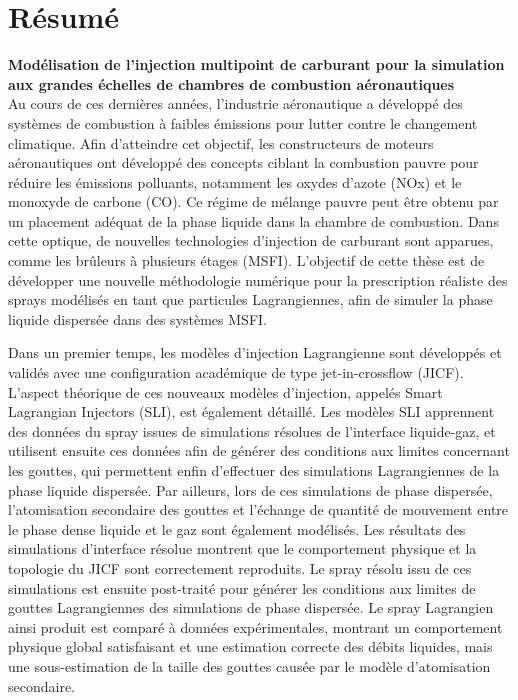     
\newpage
\shipout\null 
{}
\newpage
    
\chapter*{Résumé}

{\large \textbf{Modélisation de l'injection multipoint de carburant pour la simulation aux grandes échelles de chambres de combustion aéronautiques }} \\

Au cours de ces dernières années, l’industrie aéronautique a développé des systèmes de combustion à faibles émissions pour lutter contre le changement climatique. Afin d'atteindre cet objectif, les constructeurs de moteurs aéronautiques ont développé des concepts ciblant la combustion pauvre pour réduire les émissions polluants, notamment les oxydes d’azote (NOx) et le monoxyde de carbone (CO). Ce régime de mélange pauvre peut être obtenu par un placement adéquat de la phase liquide dans la chambre de combustion. Dans cette optique, de nouvelles technologies d’injection de carburant sont apparues, comme les brûleurs à plusieurs étages (MSFI). L’objectif de cette thèse est de développer une nouvelle méthodologie numérique pour la prescription réaliste des sprays modélisés en tant que particules Lagrangiennes, afin de simuler la phase liquide dispersée dans des systèmes MSFI.

Dans un premier temps, les modèles d’injection Lagrangienne sont développés et validés avec une configuration académique de type jet-in-crossflow (JICF). L’aspect théorique de ces nouveaux modèles d’injection, appelés Smart Lagrangian Injectors (SLI), est également détaillé. Les modèles SLI apprennent des données du spray issues de simulations résolues de l’interface liquide-gaz, et utilisent ensuite ces données afin de générer des conditions aux limites concernant les gouttes, qui permettent enfin d’effectuer des simulations Lagrangiennes de la phase liquide dispersée. Par ailleurs, lors de ces simulations de phase dispersée, l’atomisation secondaire des gouttes et l’échange de quantité de mouvement entre le phase dense liquide et le gaz sont également modélisés. Les résultats des simulations d’interface résolue montrent que le comportement physique et la topologie du JICF sont correctement reproduits. Le spray résolu issu de ces simulations est ensuite post-traité pour générer les conditions aux limites de gouttes Lagrangiennes des simulations de phase dispersée. Le spray Lagrangien ainsi produit est comparé à données expérimentales, montrant un comportement physique global satisfaisant et une estimation correcte des débits liquides, mais une sous-estimation de la taille des gouttes causée par le modèle d’atomisation secondaire.

